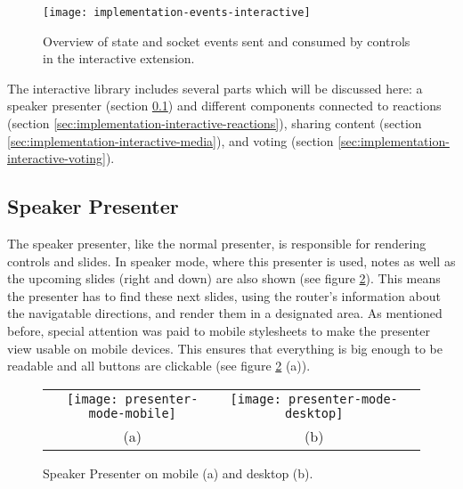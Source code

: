 \begin{figure}
\centering
\texttt{[image: implementation-events-interactive]}
\caption{Overview of state and socket events sent and consumed by controls in the interactive extension.}
\label{fig:implementation-events-interactive}
\end{figure}

The interactive library includes several parts which will be discussed here: a speaker presenter (section \ref{sec:implementation-interactive-speaker-presenter}) and different components connected to reactions (section \ref{sec:implementation-interactive-reactions}), sharing content (section \ref{sec:implementation-interactive-media}), and voting (section \ref{sec:implementation-interactive-voting}).

\subsection{Speaker Presenter}
\label{sec:implementation-interactive-speaker-presenter}

The speaker presenter, like the normal presenter, is responsible for rendering controls and slides. In speaker mode, where this presenter is used, notes as well as the upcoming slides (right and down) are also shown (see figure \ref{fig:implementation-interactive-speaker-presenter}).
This means the presenter has to find these next slides, using the router's information about the navigatable directions, and render them in a designated area. As mentioned before, special attention was paid to mobile stylesheets to make the presenter view usable on mobile devices. This ensures that everything is big enough to be readable and all buttons are clickable (see figure \ref{fig:implementation-interactive-speaker-presenter} (a)).

\begin{figure}
\centering
\begin{tabular}{ccc}
\texttt{[image: presenter-mode-mobile]} &
\texttt{[image: presenter-mode-desktop]} \\
(a) & (b)
\end{tabular}
\caption{Speaker Presenter on mobile (a) and desktop (b).}
\label{fig:implementation-interactive-speaker-presenter}
\end{figure}

